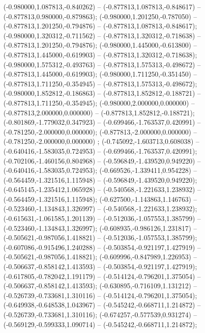  (-0.980000,1.087813,-0.840262) -- (-0.877813,1.087813,-0.848617) -- (-0.877813,0.980000,-0.879863);
 (-0.980000,1.201250,-0.787050) -- (-0.877813,1.201250,-0.794876) -- (-0.877813,1.087813,-0.848617);
 (-0.980000,1.320312,-0.711562) -- (-0.877813,1.320312,-0.718638) -- (-0.877813,1.201250,-0.794876);
 (-0.980000,1.445000,-0.613800) -- (-0.877813,1.445000,-0.619903) -- (-0.877813,1.320312,-0.718638);
 (-0.980000,1.575312,-0.493763) -- (-0.877813,1.575313,-0.498672) -- (-0.877813,1.445000,-0.619903);
 (-0.980000,1.711250,-0.351450) -- (-0.877813,1.711250,-0.354945) -- (-0.877813,1.575313,-0.498672);
 (-0.980000,1.852812,-0.186863) -- (-0.877813,1.852812,-0.188721) -- (-0.877813,1.711250,-0.354945);
 (-0.980000,2.000000,0.000000) -- (-0.877813,2.000000,0.000000) -- (-0.877813,1.852812,-0.188721);
 (-0.801869,-1.779032,0.347923) -- (-0.699466,-1.763537,0.420991) -- (-0.781250,-2.000000,0.000000);
 (-0.877813,-2.000000,0.000000) -- (-0.781250,-2.000000,0.000000) ;
 (-0.745092,-1.603713,0.608038) -- (-0.640416,-1.583035,0.724953) -- (-0.699466,-1.763537,0.420991);
 (-0.702106,-1.460156,0.804968) -- (-0.596849,-1.439520,0.949220) -- (-0.640416,-1.583035,0.724953);
 (-0.669526,-1.339411,0.954228) -- (-0.564459,-1.321516,1.115948) -- (-0.596849,-1.439520,0.949220);
 (-0.645145,-1.235412,1.065928) -- (-0.540568,-1.221633,1.238932) -- (-0.564459,-1.321516,1.115948);
 (-0.627500,-1.143863,1.146763) -- (-0.523460,-1.134843,1.326997) -- (-0.540568,-1.221633,1.238932);
 (-0.615631,-1.061585,1.201139) -- (-0.512036,-1.057553,1.385799) -- (-0.523460,-1.134843,1.326997);
 (-0.608935,-0.986126,1.231817) -- (-0.505621,-0.987056,1.418821) -- (-0.512036,-1.057553,1.385799);
 (-0.607086,-0.915496,1.240288) -- (-0.503854,-0.921197,1.427919) -- (-0.505621,-0.987056,1.418821);
 (-0.609996,-0.847989,1.226953) -- (-0.506637,-0.858142,1.413593) -- (-0.503854,-0.921197,1.427919);
 (-0.617805,-0.782042,1.191179) -- (-0.514124,-0.796201,1.375054) -- (-0.506637,-0.858142,1.413593);
 (-0.630895,-0.716109,1.131212) -- (-0.526739,-0.733681,1.310116) -- (-0.514124,-0.796201,1.375054);
 (-0.649938,-0.648538,1.043967) -- (-0.545242,-0.668711,1.214872) -- (-0.526739,-0.733681,1.310116);
 (-0.674257,-0.577539,0.931274) -- (-0.569129,-0.599333,1.090714) -- (-0.545242,-0.668711,1.214872);
